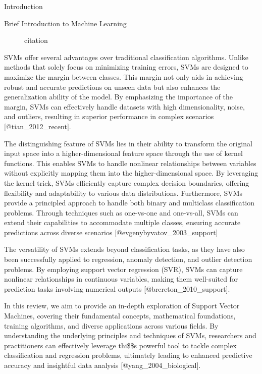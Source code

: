 \documentclass[
  ignorenonframetext,
]{beamer}
\begin{document}
\begin{frame}{Introduction}
\begin{block}{Brief Introduction to Machine Learning}
\begin{figure}
{}

\caption{citation}

\end{figure}

SVMs offer several advantages over traditional classification
algorithms. Unlike methods that solely focus on minimizing training
errors, SVMs are designed to maximize the margin between classes. This
margin not only aids in achieving robust and accurate predictions on
unseen data but also enhances the generalization ability of the model.
By emphasizing the importance of the margin, SVMs can effectively handle
datasets with high dimensionality, noise, and outliers, resulting in
superior performance in complex scenarios {[}@tian\_2012\_recent{]}.

The distinguishing feature of SVMs lies in their ability to transform
the original input space into a higher-dimensional feature space through
the use of kernel functions. This enables SVMs to handle nonlinear
relationships between variables without explicitly mapping them into the
higher-dimensional space. By leveraging the kernel trick, SVMs
efficiently capture complex decision boundaries, offering flexibility
and adaptability to various data distributions. Furthermore, SVMs
provide a principled approach to handle both binary and multiclass
classification problems. Through techniques such as one-vs-one and
one-vs-all, SVMs can extend their capabilities to accommodate multiple
classes, ensuring accurate predictions across diverse scenarios
{[}@evgenybyvatov\_2003\_support{]}

The versatility of SVMs extends beyond classification tasks, as they
have also been successfully applied to regression, anomaly detection,
and outlier detection problems. By employing support vector regression
(SVR), SVMs can capture nonlinear relationships in continuous variables,
making them well-suited for prediction tasks involving numerical outputs
{[}@brereton\_2010\_support{]}.

In this review, we aim to provide an in-depth exploration of Support
Vector Machines, covering their fundamental concepts, mathematical
foundations, training algorithms, and diverse applications across
various fields. By understanding the underlying principles and
techniques of SVMs, researchers and practitioners can effectively
leverage thi\$\$s powerful tool to tackle complex classification and
regression problems, ultimately leading to enhanced predictive accuracy
and insightful data analysis {[}@yang\_2004\_biological{]}.
\end{block}
\end{frame}
\end{document}
